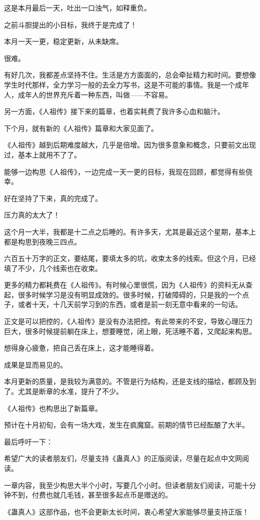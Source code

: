 \begin{this_body} %

这是本月最后一天，吐出一口浊气，如释重负。

之前斗胆提出的小目标，我终于是完成了！

本月一天一更，稳定更新，从未缺席。

很难。

有好几次，我都差点坚持不住。生活是方方面面的，总会牵扯精力和时间。要想像学生时代那样，全力学习一般的去全力写书，这是不可能的事情。我是一个成年人，成年人的世界充斥着一种东西，叫做——不容易。

另一方面，《人祖传》接下来的篇章，也着实耗费了我许多心血和脑汁。

下个月，就有新的《人祖传》篇章和大家见面了。

《人祖传》越到后期难度越大，几乎是倍增。因为很多意象和概念，只要前文出现过，基本上就用不了了。

能够一边构思《人祖传》，一边完成一天一更的目标，我现在回顾，都觉得有些侥幸。

好在坚持了下来，真的完成了。

压力真的太大了！

这个月一大半，我都是十二点之后睡的。有许多天，尤其是最近这个星期，基本上都是构思到夜晚三四点。

六百五十万字的正文，要结尾，要填太多的坑，收束太多的线索。但这个月，已经填了不少，几个线索也在收束。

更多的精力都耗费在《人祖传》。有时候心里很慌，因为《人祖传》的资料无从查起，很多时候学习是没有明显成效的。很多时候，打破障碍的，只是我的一个点子，或者十天，十几天前学习到的东西，或者是前一刻无意中看来的一句话。

正文是可以把控的，《人祖传》是没有办法把控。有此带来的不安，导致心理压力巨大，很多时候提前躺在床上，想要睡觉，闭上眼，死活睡不着，又爬起来构思。

想得身心疲惫，把自己丢在床上，这才能睡得着。

成果是显而易见的。

本月更新的质量，是我较为满意的。不管是行为结构，还是支线的描绘，都顾及到了。尤其是断章的水准，提升了不少。

《人祖传》也构思出了新篇章。

预计在十月初旬，会有一场大戏，发生在疯魔窟。前期的情节已经酝酿了大半。

最后呼吁一下：

希望广大的读者朋友们，尽量支持《蛊真人》的正版阅读，尽量在起点中文网阅读。

一章内容，我至少构思大半个小时，写要几个小时。但读者朋友们阅读，可能十分钟不到，付费也就几毛钱，甚至很多起点币是赠送的。

《蛊真人》这部作品，也不会更新太长时间，衷心希望大家能够尽量支持正版！

\end{this_body}

